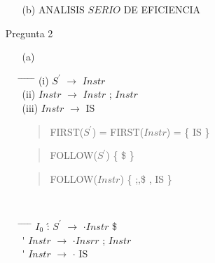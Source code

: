 \documentclass{article}
\begin{document}
\begin{enumerate}
\begin{enumerate}
\begin{enumerate}
						\end{enumerate}
					\item[(b)] ANALISIS $SERIO$ DE EFICIENCIA
					
					\end{enumerate}
				\large \bf \item[] Pregunta 2
				\normalsize \mdseries
					\begin{enumerate}
					\item[(a)]								
					\begin{tabbing}
								\hspace*{1cm} \= \hspace*{1cm} \= \hspace*{1cm} \= \hspace*{0.6cm} \= \hspace*{0.6cm} \= \hspace*{3cm} \kill
									\> (i)\>  $S^{\prime}$	\> $\longrightarrow$\> 	$Instr$ 	\\
									\> (ii)\>  $Instr$	\> $\longrightarrow$\> 	$Instr$ ; $Instr$ 	\\
									\> (iii)\>  $Instr$	\> $\longrightarrow$\>  IS 	\\
					\end{tabbing}
					\begin{quotation}
						FIRST($S^{\prime}$) =  FIRST($Instr$) = \{ IS \}
					\end{quotation}		
					\begin{quotation}
						FOLLOW($S^{\prime}$) \{ \$ \}
					\end{quotation}
					\begin{quotation}
						FOLLOW($Instr$) \{ ;,\$ , IS \}
					\end{quotation}						
					\ \ 
					\begin{tabbing}
					 \hspace*{1cm} \= \hspace*{1cm} \= \hspace*{0.8cm} \= \hspace*{0.6cm} \= \hspace*{3cm} \kill
						\> $I_{0}$	\' : 	\> $S^{\prime}$		\> $\longrightarrow$\> 	$\cdot Instr$ \$	\\
						\>			\'  	\> $Instr$ 			\> $\longrightarrow$\> 	$\cdot Insrr$ ; $Instr$	\\
						\>			\'  	\> $Instr$ 			\> $\longrightarrow$\> 	$\cdot$ IS	\\



\end{tabbing}
\end{enumerate}
\end{enumerate}
\end{document}

